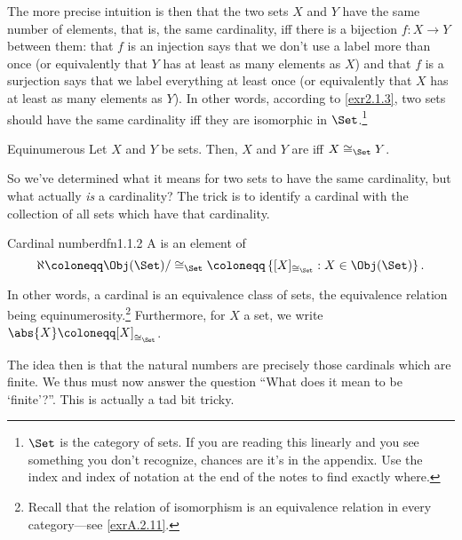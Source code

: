 The more precise intuition is then that the two sets $X$ and $Y$ have the same number of elements, that is, the same cardinality, iff there is a bijection $f\colon X\rightarrow Y$ between them:  that $f$ is an injection says that we don't use a label more than once (or equivalently that $Y$ has at least as many elements as $X$) and that $f$ is a surjection says that we label everything at least once (or equivalently that $X$ has at least as many elements as $Y$).  In other words, according to \cref{exr2.1.3}, two sets should have the same cardinality iff they are isomorphic in $\Set$.\footnote{$\Set$ is the category of sets.  If you are reading this linearly and you see something you don't recognize, chances are it's in the appendix.  Use the index and index of notation at the end of the notes to find exactly where.}
\begin{dfn}{Equinumerous}{}
Let $X$ and $Y$ be sets.  Then, $X$ and $Y$ are  iff $X\cong _{\Set}Y$.
\end{dfn}

So we've determined what it means for two sets to have the same cardinality, but what actually \emph{is} a cardinality?  The trick is to identify a cardinal with the collection of all sets which have that cardinality.
\begin{dfn}{Cardinal number}{dfn1.1.2}
A  is an element of
\begin{equation}
\aleph \coloneqq \Obj (\Set )/\cong _{\Set}\coloneqq \left\{ [X]_{\cong _{\Set}}:X\in \Obj (\Set )\right\} .
\end{equation}
\begin{rmk}
In other words, a cardinal is an equivalence class of sets, the equivalence relation being equinumerosity.\footnote{Recall that the relation of isomorphism is an equivalence relation in every category---see \cref{exrA.2.11}.}  Furthermore, for $X$ a set, we write $\abs{X}\coloneqq [X]_{\cong _{\Set}}$.
\end{rmk}
\end{dfn}

The idea then is that the natural numbers are precisely those cardinals which are finite.  We thus must now answer the question ``What does it mean to be `finite'?''.  This is actually a tad bit tricky.

